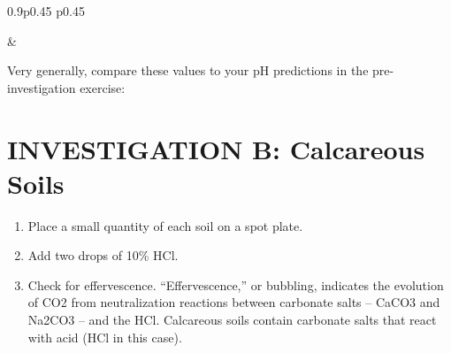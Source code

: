 \documentclass[
  letterpaper,
  twocolumn,
  portrait]{scrbook}
\providecommand{\tightlist}{%
  \setlength{\itemsep}{0pt}\setlength{\parskip}{0pt}}\usepackage{longtable,booktabs,array}
\begin{document}
\begin{table}[h!]
\begin{centerbox}
\begin{threeparttable}
\begin{tabularx}{0.9\textwidth}{p{} p{}}

 &
 \tabularnewline[-0.5pt]


\end{tabularx}
\end{threeparttable}\par\end{centerbox}

\end{table}
 

Very generally, compare these values to your pH predictions in the
pre-investigation exercise:

\hypertarget{investigation-b-calcareous-soils}{%
\section{INVESTIGATION B: Calcareous
Soils}\label{investigation-b-calcareous-soils}}

\begin{enumerate}
\def\labelenumi{\arabic{enumi}.}
\tightlist
\item
  Place a small quantity of each soil on a spot plate.
\item
  Add two drops of 10\% HCl.
\item
  Check for effervescence. ``Effervescence,'' or bubbling, indicates the
  evolution of CO2 from neutralization reactions between carbonate salts
  -- CaCO3 and Na2CO3 -- and the HCl. Calcareous soils contain carbonate
  salts that react with acid (HCl in this case).
\end{enumerate}

 
  \providecommand{\huxb}[2]{\arrayrulecolor[RGB]{#1}\global\arrayrulewidth=#2pt}
  \providecommand{\huxvb}[2]{\color[RGB]{#1}\vrule width #2pt}
  \providecommand{\huxtpad}[1]{\rule{0pt}{#1}}
  \providecommand{\huxbpad}[1]{\rule[-#1]{0pt}{#1}}
\end{document}
